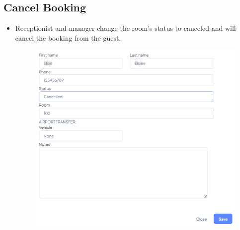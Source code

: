     \subsection{Cancel Booking}
    \begin{itemize}
        \item Receptionist and manager change the room's status to canceled and will cancel the booking from the guest.
        \begin{figure}[H]
            \includegraphics[width=1\linewidth]{img/cancelbook.png}
            \label{fig:cancelbook}
        \end{figure}
    \end{itemize}

